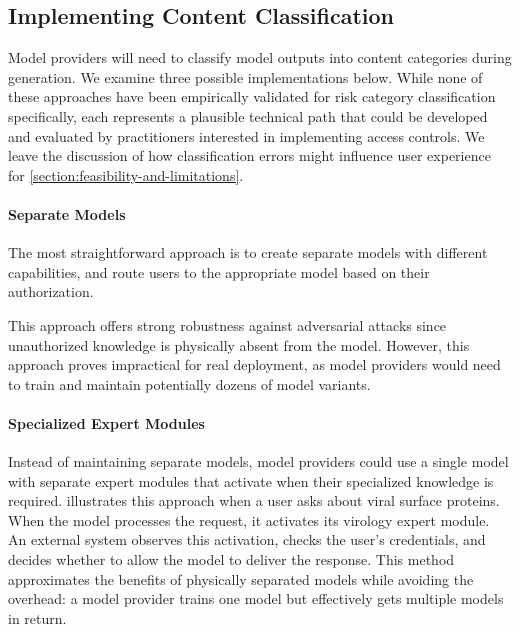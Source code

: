\documentclass{article}
\theoremstyle{plain}
\theoremstyle{definition}
\theoremstyle{remark}
\begin{document}
\subsection{Implementing Content Classification} \label{section:content-classification}

Model providers will need to classify model outputs into content categories during generation.
We examine three possible implementations below.
While none of these approaches have been empirically validated for risk category classification specifically, each represents a plausible technical path that could be developed and evaluated by practitioners interested in implementing access controls.
We leave the discussion of how classification errors might influence user experience for \cref{section:feasibility-and-limitations}.

\paragraph{Separate Models}

The most straightforward approach is to create separate models with different capabilities, and route users to the appropriate model based on their authorization.

This approach offers strong robustness against adversarial attacks since unauthorized knowledge is physically absent from the model.
However, this approach proves impractical for real deployment, as model providers would need to train and maintain potentially dozens of model variants.

\paragraph{Specialized Expert Modules}


Instead of maintaining separate models, model providers could use a single model with separate expert modules that activate when their specialized knowledge is required.
 illustrates this approach when a user asks about viral surface proteins.
When the model processes the request, it activates its virology expert module.
An external system observes this activation, checks the user's credentials, and decides whether to allow the model to deliver the response.
This method approximates the benefits of physically separated models while avoiding the overhead: a model provider trains one model but effectively gets multiple models in return.
\end{document}
